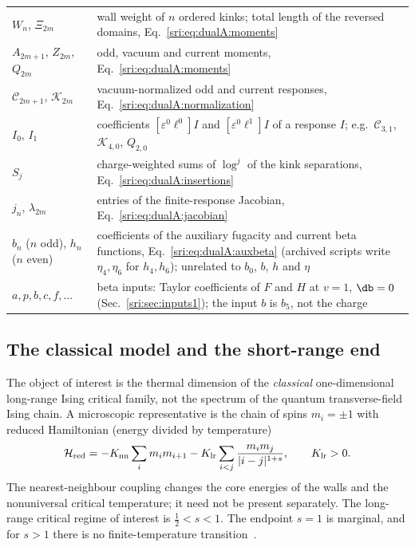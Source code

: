 {\begin{longtable}{@{}>{\raggedright\arraybackslash}p{}>{\raggedright\arraybackslash}p{}@{}}
$W_n$, $\Xi_{2m}$ & wall weight of $n$ ordered kinks; total length of the reversed domains,
 Eq.~\eqref{sri:eq:dualA:moments}\\
$A_{2m+1}$, $Z_{2m}$, $Q_{2m}$ & odd, vacuum and current moments, Eq.~\eqref{sri:eq:dualA:moments}\\
$\mathcal C_{2m+1}$, $\mathcal K_{2m}$ & vacuum-normalized odd and current responses,
 Eq.~\eqref{sri:eq:dualA:normalization}\\
$I_0$, $I_1$ & coefficients $[\varepsilon^0\ell^0]I$ and $[\varepsilon^0\ell^1]I$ of a response $I$; e.g.\
 $\mathcal C_{3,1}$, $\mathcal K_{4,0}$, $Q_{2,0}$\\
$S_j$ & charge-weighted sums of $\log^j$ of the kink separations, Eq.~\eqref{sri:eq:dualA:insertions}\\
$j_n$, $\lambda_{2m}$ & entries of the finite-response Jacobian, Eq.~\eqref{sri:eq:dualA:jacobian}\\
$b_n$ ($n$ odd), $h_n$ ($n$ even) & coefficients of the auxiliary fugacity and current beta functions,
 Eq.~\eqref{sri:eq:dualA:auxbeta} (archived scripts write $\eta_4,\eta_6$ for $h_4,h_6$); unrelated to $b_0$, $b$, $h$ and $\eta$\\
$a,p,b,c,f,\dots$ & beta inputs: Taylor coefficients of $F$ and $H$ at $v=1$, $\db=0$ (Sec.~\ref{sri:sec:inputs1}); the
 input $b$ is $b_5$, not the charge\\
\end{longtable}
}

\subsection{The classical model and the short-range end}\label{sri:app:dualA:model}
The object of interest is the thermal dimension of the \emph{classical} one-dimensional long-range Ising critical
family, not the spectrum of the quantum transverse-field Ising chain. A microscopic representative is the chain of
spins $m_i=\pm1$ with reduced Hamiltonian (energy divided by temperature)
\begin{equation}
 \mathcal H_{\rm red}=-K_{\rm nn}\sum_i m_im_{i+1}-K_{\rm lr}\sum_{i<j}\frac{m_im_j}{|i-j|^{1+s}},
 \qquad K_{\rm lr}>0.
 \label{sri:eq:dualA:lattice}
\end{equation}
The nearest-neighbour coupling changes the core energies of the walls and the nonuniversal critical temperature; it
need not be present separately. The long-range critical regime of interest is $\frac12<s<1$. The endpoint $s=1$ is
marginal, and for $s>1$ there is no finite-temperature transition~\cite{sri:Benedetti:2024wgx,sri:Benedetti:2025nzp}.

